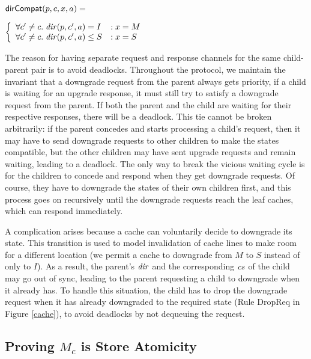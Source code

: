 \begin{defn}
$\mathsf{dirCompat}(p, c, x, a) =$

\begin{math}
\left\{
\begin{array}{ll}
\forall c' \neq c. \; \mathit{dir}(p,c',a) = I &: x = M\\
\forall c' \neq c. \; \mathit{dir}(p,c',a) \le S &: x = S\\
\end{array}
\right.
\end{math}
\end{defn}

The reason for having separate request and response channels for the same
child-parent pair is to avoid deadlocks. Throughout the protocol, we maintain
the invariant that a downgrade request from the parent always gets priority,
\ie{} if a child is waiting for an upgrade response, it must still try to
satisfy a downgrade request from the parent. If both the parent and the child
are waiting for their respective responses, there will be a deadlock. This tie
cannot be broken arbitrarily: if the parent concedes and starts processing a
child's request, then it may have to send downgrade requests to other children
to make the states compatible, but the other children may have sent upgrade
requests and remain waiting, leading to a deadlock. The only way to break the
vicious waiting cycle is for the children to concede and respond when they get
downgrade requests. Of course, they have to downgrade the states of their own
children first, and this process goes on recursively until the downgrade
requests reach the leaf caches, which can respond immediately.

A complication arises because a cache can voluntarily decide to downgrade its
state.  This transition is used to model invalidation of cache lines to make
room for a different location (we permit a cache to downgrade from $M$ to $S$
instead of only to $I$).
As a result, the parent's $\mathit{dir}$ and the
corresponding $\mathit{cs}$ of the child may go out of sync, leading to the parent
requesting a child to downgrade when it already has. To handle this situation,
the child has to drop the downgrade request when it has already downgraded to
the required state (Rule DropReq in Figure \ref{cache}), to avoid deadlocks
by not dequeuing the request.



\subsection{Proving $M_c$ is Store Atomicity}\label{sec:ccproof}
\label{safety}

